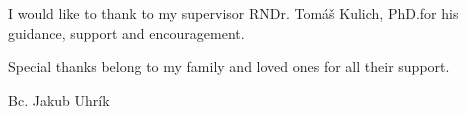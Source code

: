 \documentclass[oneside, 12pt]{book}
\def\mfauthor{Bc. Jakub Uhrík}                            %
\def\mfadvisor{RNDr. Tomáš Kulich, PhD.}                                  %
\begin{document}
{~}\vspace{12cm}

\noindent
\begin{minipage}{0.25\textwidth}~\end{minipage}
\begin{center}
\begin{minipage}{1\textwidth}

I would like to thank to my supervisor \mfadvisor  for his guidance, support and encouragement. 

Special thanks belong to my family and loved ones for all their support.

\end{minipage}
\end{center}
\hfill\mfauthor
\vfill\eject 



%

\end{document}
